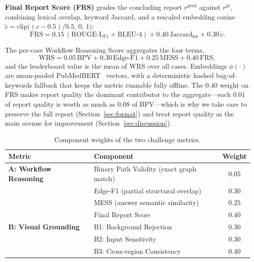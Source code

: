 \documentclass[11pt]{article}
\begin{document}
\noindent\textbf{Final Report Score (FRS)} grades the concluding report
$r^{\text{pred}}$ against $r^{\text{gt}}$, combining lexical overlap, keyword
Jaccard, and a rescaled embedding cosine
$\tilde c=\mathrm{clip}\big((c-0.5)/0.5,\,0,\,1\big)$:
\begin{equation}
\mathrm{FRS}=0.15\,(\mathrm{ROUGE\text{-}L}_{\mathrm{F1}}+\mathrm{BLEU\text{-}4})
+0.40\,\mathrm{Jaccard}_{\mathrm{kw}}+0.30\,\tilde c .
\end{equation}

The per-case Workflow Reasoning Score aggregates the four terms,
\begin{equation}
\label{eq:wrs}
\mathrm{WRS}=0.05\,\mathrm{BPV}+0.30\,\mathrm{Edge\text{-}F1}+0.25\,\mathrm{MESS}+0.40\,\mathrm{FRS},
\end{equation}
and the leaderboard value is the mean of $\mathrm{WRS}$ over all cases.
Embeddings $\phi(\cdot)$ are mean-pooled PubMedBERT~\cite{gu2021pubmedbert}
vectors, with a deterministic hashed bag-of-keywords fallback that keeps the
metric runnable fully offline. The $0.40$ weight on FRS makes report quality the
dominant contributor to the aggregate---each $0.01$ of report quality is worth as
much as $0.08$ of BPV---which is why we take care to preserve the full report
(Section~\ref{sec:format}) and treat report quality as the main avenue for
improvement (Section~\ref{sec:discussion}).

\begin{table}[t]
\centering
\caption{Component weights of the two challenge metrics.}
\label{tab:weightsA}
\begin{tabular}{llc}
\toprule
\textbf{Metric} & \textbf{Component} & \textbf{Weight}\\
\midrule
\textbf{A: Workflow Reasoning} & Binary Path Validity (exact graph match) & $0.05$\\
 & Edge-F1 (partial structural overlap)     & $0.30$\\
 & MESS (answer semantic similarity)        & $0.25$\\
 & Final Report Score                       & $0.40$\\
\midrule
\textbf{B: Visual Grounding} & B1: Background Rejection                  & $0.30$\\
 & B2: Input Sensitivity                     & $0.30$\\
 & B3: Cross-region Consistency              & $0.40$\\
\bottomrule
\end{tabular}
\end{table}
\end{document}
